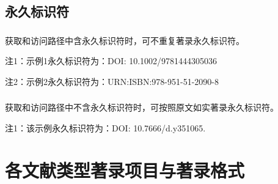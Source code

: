 \documentclass[twoside]{article}%
\begin{document}
\subsection{永久标识符}\label{sec:identier:doi}

\subsubsection{} 获取和访问路径中含永久标识符时，可不重复著录永久标识符。

\begin{refsection}

\nocite{Deverell2013-21-22,GROSS2016LM}

{\printbibliography[heading=none,env=exampleenv]}
\end{refsection}

\mbox{}{\small 注1：示例1永久标识符为：DOI: 10.1002/9781444305036  \par}

\mbox{}{\small 注2：示例2永久标识符为：URN:ISBN:978-951-51-2090-8   \par}


\subsubsection{} 获取和访问路径中不含永久标识符时，可按照原文如实著录永久标识符。

\begin{refsection}

\nocite{刘乃安2000-17-18}

{\printbibliography[heading=none,env=exampleenv]}

\end{refsection}


\mbox{}{\small 注1：该示例永久标识符为：DOI: 10.7666/d.y351065. \par}


\section{各文献类型著录项目与著录格式}\label{sec:biblio:fmt}

%
\end{document}
